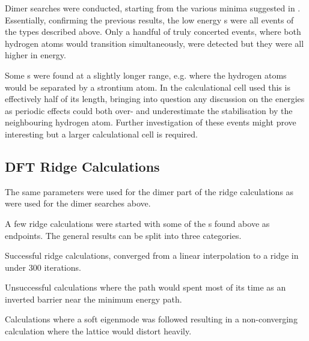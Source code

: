 Dimer  searches were conducted, starting from the various minima suggested in \cite{double-defect-2011}.
Essentially, confirming the previous results, the low energy s were all events of the types described above.
Only a handful of truly concerted events, where both hydrogen atoms would transition simultaneously, were detected but they were all higher in energy.

Some s were found at a slightly longer range, e.g. where the hydrogen atoms would be separated by a strontium atom.
In the calculational cell used this is effectively half of its length, bringing into question any discussion on the energies as periodic effects could both over- and underestimate the stabilisation by the neighbouring hydrogen atom.
Further investigation of these events might prove interesting but a larger calculational cell is required.

\subsection{DFT Ridge Calculations}
The same parameters were used for the dimer part of the ridge calculations as were used for the dimer searches above.

A few ridge calculations were started with some of the s found above as endpoints.
The general results can be split into three categories.
\bit
\item Successful ridge calculations, converged from a linear interpolation to a ridge in under 300 iterations.
\item Unsuccessful calculations where the path would spent most of its time as an inverted barrier near the minimum energy path.
\item Calculations where a soft eigenmode was followed resulting in a non-converging calculation where the lattice would distort heavily.
\eit


